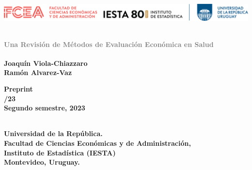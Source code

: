 \documentclass[12pt]{article}
\begin{document}
	
	\thispagestyle{empty} 
\begin{center}
	\includegraphics[width=1.00\textwidth]{grafi/logo_inst_80.png}
\end{center}

\vspace{0.3 cm}	
\begin{center}
	\hrulefill	\\
	\vspace{0.5 cm}
\textbf{\huge \textcolor{gray} {Una Revisi\'on de M\'etodos de Evaluaci\'on Econ\'omica en Salud}}	\\
	\vspace{0.3 cm}
\hrulefill	\\
\vspace{0.5 cm}
\textbf{Joaqu\'in Viola-Chiazzaro}\\
\vspace{0.5 cm}
\textbf{Ram\'on Alvarez-Vaz}\\
\vspace{0.20 cm}

\end{center}
\vspace{0.5 cm}


\begin{center}
	\textbf{\large Preprint\\
\vspace{0.3 cm}
\noindent  {}/23 \\
\vspace{0.3 cm}
\large Segundo semestre, 2023\\
}\\
\end{center}


\begin{center}
	\vspace{0.5 cm}
{\large \textbf{Universidad de la Rep\'ublica.\\Facultad de Ciencias Econ\'omicas y de Administraci\'on,\\
Instituto de Estad\'istica (IESTA)\\
\vspace{0.7 cm}
Montevideo, Uruguay.}}
\end{center}

\end{document}
